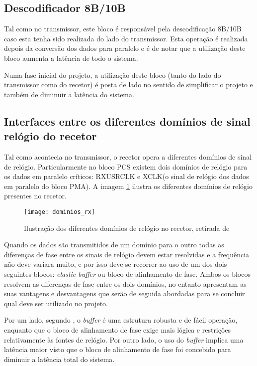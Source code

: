 \subsection{Descodificador 8B/10B}

Tal como no transmissor, este bloco é responsável pela descodificação 8B/10B caso esta tenha sido realizada do lado do transmissor. Esta operação é realizada depois da conversão dos dados para paralelo e é de notar que a utilização deste bloco aumenta a latência de todo o sistema.

Numa fase inicial do projeto, a utilização deste bloco (tanto do lado do transmissor como do recetor) é posta de lado no sentido de simplificar o projeto e também de diminuir a latência do sistema.   

\subsection{Interfaces entre os diferentes domínios de sinal relógio do recetor}

Tal como acontecia no transmissor, o recetor opera a diferentes domínios de sinal de relógio. Particularmente no bloco PCS existem dois domínios de relógio para os dados em paralelo críticos: RXUSRCLK e XCLK(o sinal de relógio dos dados em paralelo do bloco PMA). A imagem \ref{fig:dominios_rx} ilustra os diferentes domínios de relógio presentes no recetor.


\begin{figure}[h!]
	\begin{center}
		\leavevmode
		\texttt{[image: dominios\_rx]}
		\captionsetup{width=1.0\linewidth}
		\caption{Ilustração dos diferentes domínios de relógio no recetor, retirada de \cite{R011}}
		\label{fig:dominios_rx}
	\end{center}
\end{figure}

Quando os dados são transmitidos de um domínio para o outro todas as diferenças de fase entre os sinais de relógio devem estar resolvidas e a frequência não deve variara muito, e por isso deve-se recorrer ao uso de um dos dois seguintes blocos: \textit{elastic buffer} ou bloco de alinhamento de fase. Ambos os blocos resolvem as diferenças de fase entre os dois domínios, no entanto apresentam as suas vantagens e desvantagens que serão de seguida abordadas para se concluir qual deve ser utilizado no projeto.

Por um lado, segundo \cite{R011}, o \textit{buffer} é uma estrutura robusta e de fácil operação, enquanto que o bloco de alinhamento de fase exige mais lógica e restrições relativamente às fontes de relógio. Por outro lado, o uso do \textit{buffer} implica uma latência maior visto que o bloco de alinhamento de fase foi concebido para diminuir a latência total do sistema. 

